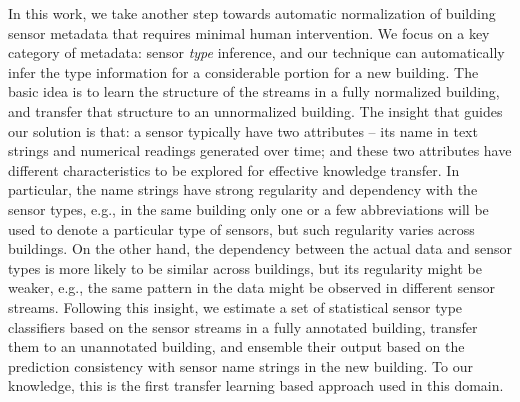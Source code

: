 In this work, we take another step towards automatic normalization of building
sensor metadata that requires minimal human intervention. 
We focus on a key category of metadata: sensor {\it type} inference, and our technique can automatically infer the type information for a considerable portion for a new building. 
The basic idea is to learn the structure of the streams in a fully normalized building, and transfer that structure to an unnormalized building. 
The insight that guides our solution is that: a sensor typically have two attributes -- its name in text strings and numerical readings generated over time; and these two attributes have different characteristics to be explored for effective knowledge transfer. 
In particular, the name strings have strong regularity and dependency with the sensor types, e.g., in the same building only one or a few abbreviations will be used to denote a particular type of sensors, but such regularity varies across buildings. 
On the other hand, the dependency between the actual data and sensor types is more likely to be similar across buildings, but its regularity might be weaker, e.g., the same pattern in the data might be observed in different sensor streams. 
Following this insight, we estimate a set of statistical sensor type classifiers based on the sensor streams in a fully annotated building, transfer them to an unannotated building, and ensemble their output based on the prediction consistency with sensor name strings in the new building. 
To our knowledge, this is the first transfer learning based approach used in this domain.

